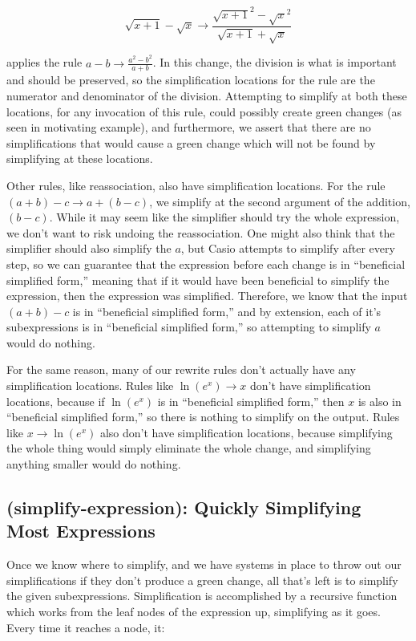 \documentclass{article}
\newcommand{\lnexp}[1]{\ln{\left(e^{#1}\right)}}
\newcommand{\sqrsqrt}[1]{\sqrt{#1}^2}
\begin{document}
\[\sqrt{x + 1} - \sqrt{x} \to \frac{\sqrsqrt{x + 1} - \sqrsqrt{x}}{\sqrt{x + 1} + \sqrt{x}}\]

applies the rule 
$a - b \to  \frac{a^2 - b^2}{a + b}$. 
In this change, 
the division is what is important 
and should be preserved, 
so the simplification locations 
for the rule are the numerator 
and denominator of the division. 
Attempting to simplify at both these locations, 
for any invocation of this rule, 
could possibly create green changes 
(as seen in motivating example), 
and furthermore, 
we assert that there are no simplifications 
that would cause a green change 
which will not be found 
by simplifying at these locations.

Other rules, like reassociation,
also have simplification locations.
For the rule $(a + b) - c \to a + (b - c)$,
we simplify at the second argument of the addition,
$(b - c)$. 
While it may seem like the simplifier
should try the whole expression,
we don't want to risk undoing the reassociation.
One might also think that the simplifier
should also simplify the $a$,
but Casio attempts to simplify after every step,
so we can guarantee that the expression
before each change is in ``beneficial simplified form,''
meaning that if it would have been beneficial
to simplify the expression,
then the expression was simplified. 
Therefore, we know that the input
$(a + b) - c$ is in ``beneficial simplified form,''
and by extension, each of it's subexpressions is in
``beneficial simplified form,''
so attempting to simplify $a$ would do nothing.

For the same reason, 
many of our rewrite rules
don't actually have any simplification locations.
Rules like $\lnexp{x}\to x$
don't have simplification locations,
because if $\lnexp{x}$ is in
``beneficial simplified form,''
then $x$ is also in ``beneficial simplified form,''
so there is nothing to simplify on the output.
Rules like $x\to\lnexp{x}$
also don't have simplification locations,
because simplifying the whole thing
would simply eliminate the whole change,
and simplifying anything smaller
would do nothing.

\subsection{(simplify-expression): Quickly Simplifying Most Expressions}

Once we know where to simplify, 
and we have systems in place 
to throw out our simplifications 
if they don't produce a green change, 
all that's left is to simplify the given subexpressions. 
Simplification is accomplished 
by a recursive function 
which works from the leaf nodes 
of the expression up, 
simplifying as it goes. 
Every time it reaches a node, it:
\end{document}
